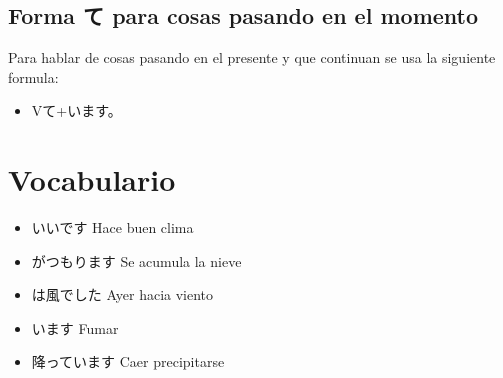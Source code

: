 \documentclass[a4paper,lualatex,ja=standard,base=10pt]{bxjsarticle}
\begin{document}
\subsection{Forma て para cosas pasando en el momento}

Para hablar de cosas pasando en el presente y que continuan se usa la siguiente formula:

\begin{itemize}
  \item Vて+います。
\end{itemize}


\section{Vocabulario}

\begin{itemize}
  \item いいです Hace buen clima
  \item {}がつもります Se acumula la nieve
  \item {}は風でした Ayer hacia viento
  \item {}います Fumar
  \item 降っています Caer precipitarse
\end{itemize}

%
%
%
%
%
%
%
%
\end{document}
